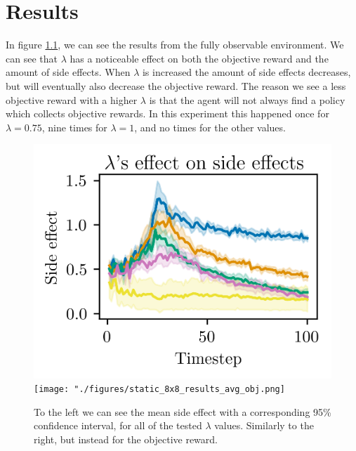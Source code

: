 \documentclass[12pt,A4]{report}
\theoremstyle{definition}
\begin{document}

\chapter{Results}

In figure \ref{fig:results_static_8x8}, we can see the results from the fully observable environment. We can see that $\lambda$ has a noticeable effect on both the objective reward and the amount of side effects. When $\lambda$ is increased the amount of side effects decreases, but will eventually also decrease the objective reward. The reason we see a less objective reward with a higher $\lambda$ is that the agent will not always find a policy which collects objective rewards. In this experiment this happened once for $\lambda=0.75$, nine times for $\lambda = 1$, and no times for the other values. 
\begin{figure}[H]
  \centering
  \includegraphics{"./figures/static_8x8_results_side_effects.png"}
  \texttt{[image: "./figures/static\_8x8\_results\_avg\_obj.png]}
  \caption{To the left we can see the mean side effect with a corresponding 95\% confidence interval, for all of the tested $\lambda$ values. Similarly to the right, but instead for the objective reward.}
  \label{fig:results_static_8x8}
\end{figure}
\end{document}
